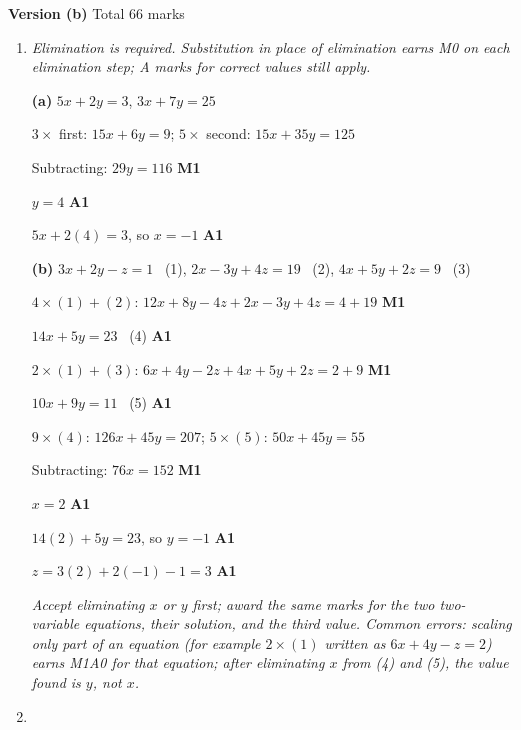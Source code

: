 \documentclass[12pt, twoside]{article}
\begin{document}
\newpage

\textbf{\large Version (b)} \hfill Total 66 marks

\begin{enumerate}[itemsep=0.3cm]

\item[1.] [Maximum mark: 11]

\emph{Elimination is required. Substitution in place of elimination earns
M0 on each elimination step; A marks for correct values still apply.}

\textbf{(a)} $5x + 2y = 3$, \quad $3x + 7y = 25$

$3 \times$ first: $15x + 6y = 9$; \quad $5 \times$ second: $15x + 35y = 125$

Subtracting: $29y = 116$ \hfill \textbf{M1}

$y = 4$ \hfill \textbf{A1}

$5x + 2(4) = 3$, so $x = -1$ \hfill \textbf{A1}

\textbf{(b)} $3x + 2y - z = 1$ \ (1), \quad $2x - 3y + 4z = 19$ \ (2),
\quad $4x + 5y + 2z = 9$ \ (3)

$4 \times (1) + (2)$: $12x + 8y - 4z + 2x - 3y + 4z = 4 + 19$ \hfill \textbf{M1}

$14x + 5y = 23$ \ (4) \hfill \textbf{A1}

$2 \times (1) + (3)$: $6x + 4y - 2z + 4x + 5y + 2z = 2 + 9$ \hfill \textbf{M1}

$10x + 9y = 11$ \ (5) \hfill \textbf{A1}

$9 \times (4)$: $126x + 45y = 207$; \quad $5 \times (5)$: $50x + 45y = 55$

Subtracting: $76x = 152$ \hfill \textbf{M1}

$x = 2$ \hfill \textbf{A1}

$14(2) + 5y = 23$, so $y = -1$ \hfill \textbf{A1}

$z = 3(2) + 2(-1) - 1 = 3$ \hfill \textbf{A1}

\emph{Accept eliminating $x$ or $y$ first; award the same marks for the
two two-variable equations, their solution, and the third value. Common
errors: scaling only part of an equation (for example $2 \times (1)$
written as $6x + 4y - z = 2$) earns M1A0 for that equation; after eliminating
$x$ from (4) and (5), the value found is $y$, not $x$.}

\newpage

\item[2.] [Maximum mark: 18]


\end{enumerate}
\end{document}
